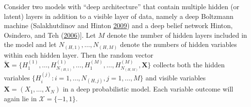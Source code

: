 \documentclass[12pt]{article}
\theoremstyle{definition}
\begin{document}
Consider two models with ``deep architecture'' that contain multiple
hidden (or latent) layers in addition to a visible layer of data, namely
a deep Boltzmann machine (Salakhutdinov and Hinton
\protect\hyperlink{ref-salakhutdinov2009deep}{2009}) and a deep belief
network Hinton, Osindero, and Teh
(\protect\hyperlink{ref-hinton2006fast}{2006}){]}. Let \(M\) denote the
number of hidden layers included in the model and let
\(N_{(H,1)}, \dots, N_{(H,M)}\) denote the numbers of hidden variables
within each hidden layer. Then the random vector
\(\tilde{\boldsymbol X} = \{H^{(1)}_1, \dots, H^{(1)}_{N_{(H,1)}}, \dots, H^{(M)}_1, \dots, H^{(M)}_{N_{(H,M)}}, \boldsymbol X\}\)
collects both the hidden variables
\(\{ H_{i}^{(j)} : i=1,\ldots, N_{(H,j)}, j=1,\ldots,M\}\) and visible
variables \(\boldsymbol X =(X_1,\ldots,X_N)\) in a deep probabilistic
model. Each variable outcome will again lie in
\(\mathcal{X} = \{-1,1\}\).
\end{document}
